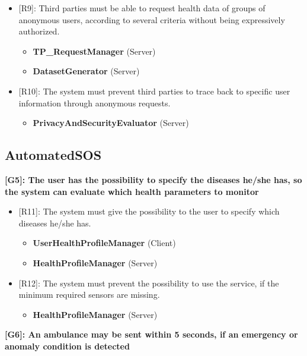 \begin{itemize}
	\item {[R9]: Third parties must be able to request health data of groups of anonymous users, according to several criteria without being expressively authorized.}
	\begin{itemize}
		\item {\textbf{TP\_RequestManager} (Server)}
		\item {\textbf{DatasetGenerator} (Server)}
	\end{itemize}   
	\item {[R10]: The system must prevent third parties to trace back to specific user information through anonymous requests.}
	\begin{itemize}
		\item {\textbf{PrivacyAndSecurityEvaluator} (Server)}
	\end{itemize}   
\end{itemize}


{\color{Blue}\subsection{AutomatedSOS}}
\raggedright
\textbf{[G5]: The user has the possibility to specify the diseases he/she has, so the system can evaluate which health parameters to monitor}

\begin{itemize}
	\item {[R11]: The system must give the possibility to the user to specify which diseases he/she has.}
	\begin{itemize}
		\item {\textbf{UserHealthProfileManager} (Client)}
		\item {\textbf{HealthProfileManager} (Server)}
	\end{itemize}   
	\item {[R12]: The system must prevent the possibility to use the service, if the minimum required sensors are missing.}
	\begin{itemize}
		\item {\textbf{HealthProfileManager} (Server)}
	\end{itemize}   
\end{itemize}

\textbf{[G6]: An ambulance may be sent within 5 seconds, if an emergency or anomaly condition is detected}

